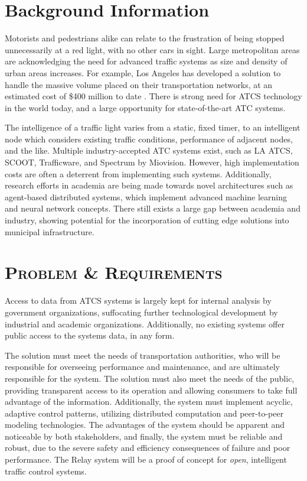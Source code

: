 \documentclass[a4paper,10pt]{article}
\begin{document}
\begin{multicols}{2}
\setlength{\parskip}{6pt}

\section{Background Information}
Motorists and pedestrians alike can relate to the frustration of being stopped unnecessarily at a red light, with no other cars in sight.
Large metropolitan areas are acknowledging the need for advanced traffic systems as size and density of urban areas increases.
For example, Los Angeles has developed a solution to handle the massive volume placed on their transportation networks, at an estimated cost of \$400 million to date \cite{la-atcs-article}.
There is strong need for ATCS technology in the world today, and a large opportunity for state-of-the-art ATC systems.

The intelligence of a traffic light varies from a static, fixed timer, to an intelligent node which considers existing traffic conditions, performance of adjacent nodes, and the like.
Multiple industry-accepted ATC systems exist, such as LA ATCS, SCOOT, Trafficware, and Spectrum by Miovision.
However, high implementation costs are often a deterrent from implementing such systems.
Additionally, research efforts in academia are being made towards novel architectures such as agent-based distributed systems, which implement advanced machine learning and neural network concepts\cite{1688100, 5073360, uot-article}.
There still exists a large gap between academia and industry, showing potential for the incorporation of cutting edge solutions into municipal infrastructure.

\section{\textsc{Problem \& Requirements}}

Access to data from ATCS systems is largely kept for internal analysis by government organizations, suffocating further technological development by industrial and academic organizations.
Additionally, no existing systems offer public access to the systems data, in any form.

The solution must meet the needs of transportation authorities, who will be responsible for overseeing performance and maintenance, and are ultimately responsible for the system.
The solution must also meet the needs of the public, providing transparent access to its operation and allowing consumers to take full advantage of the information.
Additionally, the system must implement acyclic, adaptive control patterns, utilizing distributed computation and peer-to-peer modeling technologies.
The advantages of the system should be apparent and noticeable by both stakeholders, and finally, the system must be reliable and robust, due to the severe safety and efficiency consequences of failure and poor performance. 
The Relay system will be a proof of concept for \emph{open},  intelligent traffic control systems.


\end{multicols}
\end{document}
